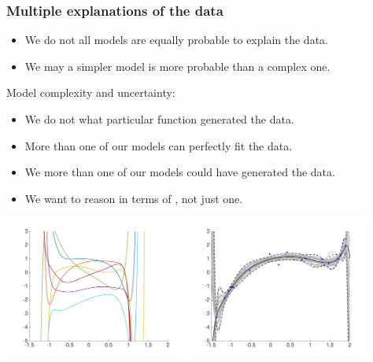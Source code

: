 \begin{frame}
\frametitle{Multiple explanations of the data}

\vspace{-0.5ex}
\begin{itemize}
\item We do not  all models are equally probable to explain the data.
\item We may  a simpler model is more probable than a complex one.
\end{itemize}
%
Model complexity and uncertainty:
\vspace{-0.5ex}
\begin{itemize}
\item We do not  what particular function generated the data.
\item More than one of our models can perfectly fit the data.
\item We  more than one of our models could have generated the data.
\item We want to reason in terms of , not just one.
\end{itemize}
%
\centerline{
\includegraphics[width=0.45\textwidth]{random_polynomials_degree17.pdf}
\includegraphics[width=0.45\textwidth]{samples_posterior_degree17.pdf}
}
%

\end{frame}

